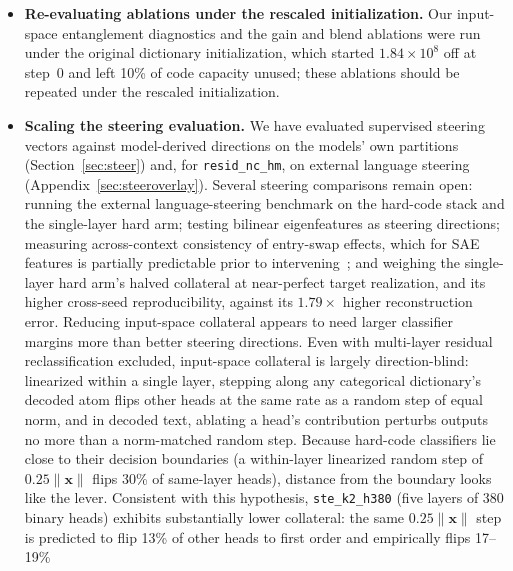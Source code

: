\begin{itemize}
fibers on top of a frozen discrete base preserved the base code's
assignments and error on GPT-2 while matching the overall reconstruction
of unconstrained joint fiber training. Although fibers are implemented on
the main branch, no SONAR run has yet used them; this two-stage recipe
should be evaluated on SONAR against SAEs at matched continuous capacity
(where rank-1 radial fibers require 160 continuous values per token).
\item \textbf{Re-evaluating ablations under the rescaled initialization.}
Our input-space entanglement diagnostics and the gain and blend ablations
were run under the original dictionary initialization, which started
$1.84\times10^8$ off at step~0 and left 10\% of code
capacity unused; these ablations should be repeated under the rescaled
initialization.
\item \textbf{Scaling the steering evaluation.} We have evaluated
supervised steering vectors against model-derived directions on the
models' own partitions (Section~\ref{sec:steer}) and, for
\texttt{resid\_nc\_hm}, on external language steering
(Appendix~\ref{sec:steeroverlay}). Several steering comparisons remain
open: running the external language-steering benchmark on the hard-code
stack and the single-layer hard arm; testing bilinear eigenfeatures as
steering directions; measuring across-context consistency of entry-swap
effects, which for SAE features is partially predictable prior to
intervening~\cite{duan2026}; and weighing the single-layer hard arm's
halved collateral at near-perfect target realization, and its higher
cross-seed reproducibility, against its $1.79\times$ higher reconstruction
error.
Reducing input-space collateral appears to need larger classifier margins
more than better steering directions. Even with multi-layer
residual reclassification excluded, input-space collateral is largely
direction-blind: linearized within a single layer, stepping along any
categorical dictionary's decoded atom flips other heads at the same rate
as a random step of equal norm, and in decoded text, ablating a head's
contribution perturbs outputs no more than a norm-matched random step.
Because hard-code classifiers lie close to their decision boundaries (a
within-layer linearized random step of $0.25\lVert\mathbf{x}\rVert$ flips
30\% of same-layer heads), distance from the boundary looks like the
lever. Consistent with this hypothesis, \texttt{ste\_k2\_h380}
(five layers of 380 binary heads) exhibits substantially lower
collateral: the same $0.25\lVert\mathbf{x}\rVert$ step is predicted to
flip 13\% of other heads to first order and empirically flips 17--19\%

\end{itemize}
